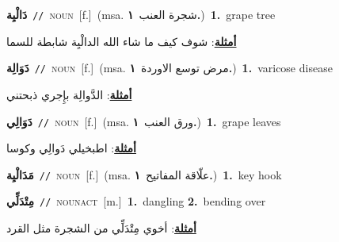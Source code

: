 \documentclass[10pt,a4paper,twoside]{article} %
\begin{document}
\begin{multicols}{2}
{\setlength\topsep{0pt}\textbf{\foreignlanguage{arabic}{دَالْيِة}}\ {\color{gray}\texttt{//}\color{black}}\ \textsc{noun}\ [f.]\ \color{gray}(msa. \foreignlanguage{arabic}{شجرة العنب}~\foreignlanguage{arabic}{\textbf{١.}})\color{black}\ \textbf{1.}~grape tree\  \begin{flushright}\color{gray}\foreignlanguage{arabic}{\textbf{\underline{\foreignlanguage{arabic}{أمثلة}}}: شوف كيف ما شاء الله الدالْيِة شابطة للسما}\end{flushright}\color{black}} \vspace{2mm}

{\setlength\topsep{0pt}\textbf{\foreignlanguage{arabic}{دَوَالِة}}\ {\color{gray}\texttt{//}\color{black}}\ \textsc{noun}\ [f.]\ \color{gray}(msa. \foreignlanguage{arabic}{مرض توسع الاوردة}~\foreignlanguage{arabic}{\textbf{١.}})\color{black}\ \textbf{1.}~varicose disease\  \begin{flushright}\color{gray}\foreignlanguage{arabic}{\textbf{\underline{\foreignlanguage{arabic}{أمثلة}}}: الدَّوالِة بإِجري ذبحتني}\end{flushright}\color{black}} \vspace{2mm}

{\setlength\topsep{0pt}\textbf{\foreignlanguage{arabic}{دَوَالِي}}\ {\color{gray}\texttt{//}\color{black}}\ \textsc{noun}\ [f.]\ \color{gray}(msa. \foreignlanguage{arabic}{ورق العنب}~\foreignlanguage{arabic}{\textbf{١.}})\color{black}\ \textbf{1.}~grape leaves\  \begin{flushright}\color{gray}\foreignlanguage{arabic}{\textbf{\underline{\foreignlanguage{arabic}{أمثلة}}}: اطبخيلي دَوالِي وكوسا}\end{flushright}\color{black}} \vspace{2mm}

{\setlength\topsep{0pt}\textbf{\foreignlanguage{arabic}{مَدَالْيِة}}\ {\color{gray}\texttt{//}\color{black}}\ \textsc{noun}\ [f.]\ \color{gray}(msa. \foreignlanguage{arabic}{علّاقة المفاتيح}~\foreignlanguage{arabic}{\textbf{١.}})\color{black}\ \textbf{1.}~key hook\ } \vspace{2mm}

{\setlength\topsep{0pt}\textbf{\foreignlanguage{arabic}{مِتْدَلِّي}}\ {\color{gray}\texttt{//}\color{black}}\ \textsc{noun\textunderscore act}\ [m.]\ \textbf{1.}~dangling  \textbf{2.}~bending over\  \begin{flushright}\color{gray}\foreignlanguage{arabic}{\textbf{\underline{\foreignlanguage{arabic}{أمثلة}}}: أخوي مِتْدَلِّي من الشجرة مثل القرد}\end{flushright}\color{black}} \vspace{2mm}


\end{multicols}
\end{document}
